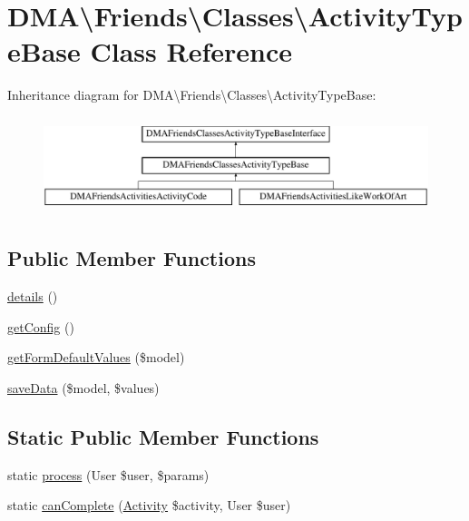 \hypertarget{classDMA_1_1Friends_1_1Classes_1_1ActivityTypeBase}{\section{D\-M\-A\textbackslash{}Friends\textbackslash{}Classes\textbackslash{}Activity\-Type\-Base Class Reference}
\label{classDMA_1_1Friends_1_1Classes_1_1ActivityTypeBase}
}
Inheritance diagram for D\-M\-A\textbackslash{}Friends\textbackslash{}Classes\textbackslash{}Activity\-Type\-Base\-:\begin{figure}[H]
\begin{center}
\leavevmode
\includegraphics[height=2.837838cm]{d3/d35/classDMA_1_1Friends_1_1Classes_1_1ActivityTypeBase}
\end{center}
\end{figure}
\subsection*{Public Member Functions}
\begin{DoxyCompactItemize}
\item 
\hyperlink{classDMA_1_1Friends_1_1Classes_1_1ActivityTypeBase_a6d83ca41e1c971c65cbc360e6097ad79}{details} ()
\item 
\hyperlink{classDMA_1_1Friends_1_1Classes_1_1ActivityTypeBase_ac540cd6b45fa5f41575523bbb300d18c}{get\-Config} ()
\item 
\hyperlink{classDMA_1_1Friends_1_1Classes_1_1ActivityTypeBase_ae46d0cc7e040eb4166e55a00d8d30dc8}{get\-Form\-Default\-Values} (\$model)
\item 
\hyperlink{classDMA_1_1Friends_1_1Classes_1_1ActivityTypeBase_a69d28814a4cc0c3798d1ab7a95e14ef3}{save\-Data} (\$model, \$values)
\end{DoxyCompactItemize}
\subsection*{Static Public Member Functions}
\begin{DoxyCompactItemize}
\item 
static \hyperlink{classDMA_1_1Friends_1_1Classes_1_1ActivityTypeBase_a772667f95a25c6aa44e31ce9c6903384}{process} (User \$user, \$params)
\item 
static \hyperlink{classDMA_1_1Friends_1_1Classes_1_1ActivityTypeBase_acc0d37915d9170364f381945fd01f7c2}{can\-Complete} (\hyperlink{classDMA_1_1Friends_1_1Models_1_1Activity}{Activity} \$activity, User \$user)
\end{DoxyCompactItemize}

